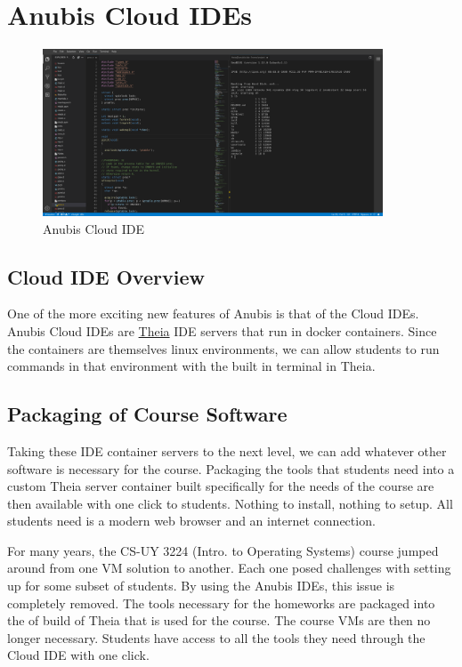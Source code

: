 \chapter{Anubis Cloud IDEs}\label{ch:cloud_ides}

\begin{figure}[ht]
    \centering
    \includegraphics[width=0.9\textwidth]{figures/theia2.png}
    \caption{Anubis Cloud IDE\label{fig:theia2}}
\end{figure}

\section{Cloud IDE Overview}\label{sec:cloud-ide-overview}

One of the more exciting new features of Anubis is that of the Cloud IDEs.
Anubis Cloud IDEs are \href{https://theia-ide.org/}{Theia} IDE servers that run
in docker containers.
Since the containers are themselves linux environments, we can allow students
to run commands in that environment with the built in terminal in Theia.

\section{Packaging of Course Software}\label{sec:packaging-of-course-software}

Taking these IDE container servers to the next level, we can add whatever 
other software is necessary for the course.
Packaging the tools that students need into a custom Theia server container
built specifically for the needs of the course are then available with 
one click to students.
Nothing to install, nothing to setup.
All students need is a modern web browser and an internet connection.

For many years, the CS-UY 3224 (Intro. to Operating Systems) course
jumped around from one VM solution to another.
Each one posed challenges with setting up for some subset of students.
By using the Anubis IDEs, this issue is completely removed.
The tools necessary for the homeworks are packaged into the of build 
of Theia that is used for the course.
The course VMs are then no longer necessary.
Students have access to all the tools they need through the Cloud IDE
with one click.

